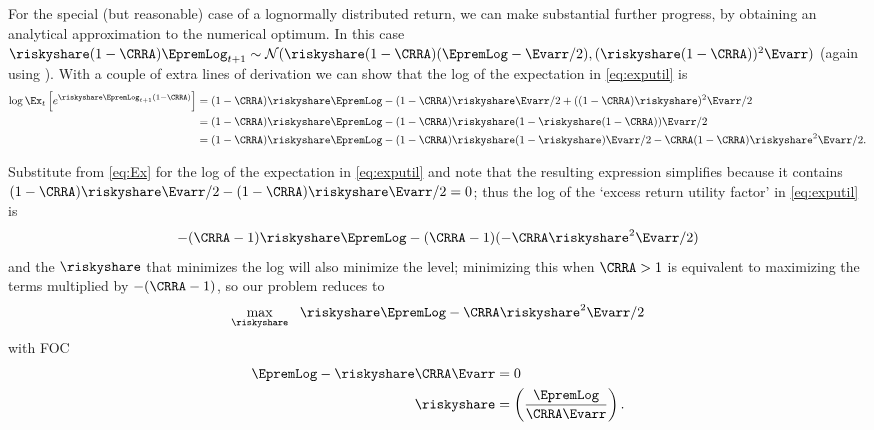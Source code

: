 For the special (but reasonable) case of a lognormally distributed return, we can make substantial further progress, by obtaining
an analytical approximation to the numerical optimum.  In this case $\riskyshare (1-\CRRA) \EpremLog_{t+1} \sim \mathcal{N}(\riskyshare (1-\CRRA)(\EpremLog - \Evarr/2),(\riskyshare(1-\CRRA))^{2}\Evarr)$ (again using \LogELogNormTimes).  With a couple of extra lines of derivation we can show that the log of the expectation in \eqref{eq:exputil} is
\begin{equation}\label{eq:Ex}\begin{split}
  \log \Ex_{t}\left[e^{\riskyshare \EpremLog_{t+1}  (1-\CRRA)}\right] & =  {(1-\CRRA)\riskyshare \EpremLog-(1-\CRRA)\riskyshare\Evarr/2+ ((1-\CRRA)\riskyshare)^{2}\Evarr/2}
\\  & =  {(1-\CRRA)\riskyshare \EpremLog-(1-\CRRA)\riskyshare(1-\riskyshare(1-\CRRA))\Evarr/2}
\\  & =  {(1-\CRRA)\riskyshare \EpremLog-(1-\CRRA)\riskyshare(1-\riskyshare)\Evarr/2-\CRRA (1-\CRRA)\riskyshare^{2}\Evarr/2}.
\end{split}\end{equation}

Substitute from \eqref{eq:Ex} for the log of the expectation in
\eqref{eq:exputil} and note that the resulting expression simplifies because it contains
${(1-\CRRA)\riskyshare\Evarr/2-(1-\CRRA)\riskyshare\Evarr/2}=0$;
thus the log of the `excess return utility factor' in \eqref{eq:exputil} is
\begin{equation}
  -(\CRRA-1)\riskyshare \EpremLog - (\CRRA-1)(- \CRRA \riskyshare^{2}\Evarr/2)
\end{equation}
and the $\riskyshare$ that minimizes the log will also
minimize the level; minimizing this when $\CRRA>1$ is equivalent to
maximizing the terms multiplied by $-(\CRRA-1)$, so our problem
reduces to
\begin{equation}\begin{gathered}\begin{aligned}
\max_{\riskyshare}~~ \riskyshare \EpremLog -\CRRA\riskyshare^{2}\Evarr/2
\end{aligned}\end{gathered}\end{equation}
with FOC \hypertarget{riskyshareMS}{}
\begin{equation}\begin{gathered}\begin{aligned}
         \EpremLog-\riskyshare\CRRA\Evarr  & =  0  \label{eq:riskyshareMS} \\
\riskyshare & =  \left(\frac{\EpremLog}{\CRRA \Evarr}\right) .
\end{aligned}\end{gathered}\end{equation}

